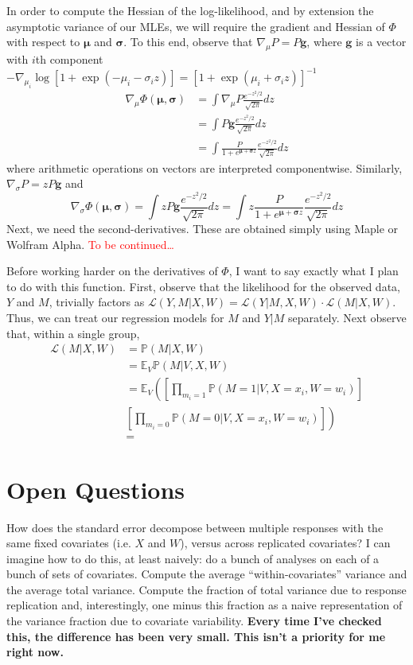 \documentclass{article}
\newcommand{\bP}{\mathbb{P}}
\newcommand{\bE}{\mathbb{E}}
\newcommand{\zdens}{\frac{e^{-z^2/2}}{\sqrt{2\pi}}}
\begin{document}
In order to compute the Hessian of the log-likelihood, and by extension the asymptotic variance of our MLEs, we will require the gradient and Hessian of $\Phi$ with respect to $\bm{\mu}$ and $\bm{\sigma}$. To this end, observe that $\nabla_\mu P = P \bm{g}$, where $\bm{g}$ is a vector with $i$th component $- \nabla_{\mu_i} \log[1 + \exp(-\mu_i - \sigma_i z)] = [1 + \exp(\mu_i + \sigma_i z)]^{-1}$
%
\begin{align}
    \nabla_{\mu} \Phi(\bm{\mu}, \bm{\sigma}) &= \int \nabla_\mu P \frac{e^{-z^2/2}}{\sqrt{2\pi}} dz\\
    &=  \int P \bm{g} \zdens dz\\
    &= \int \frac{P}{1 + e^{\bm{\mu} + \bm{\sigma}z}} \zdens dz
\end{align}
%
where arithmetic operations on vectors are interpreted componentwise.
Similarly, $\nabla_\sigma P = z P \bm{g}$ and
%
\begin{equation}
    \nabla_{\sigma} \Phi(\bm{\mu}, \bm{\sigma}) = \int z P \bm{g} \zdens dz = \int z \frac{P}{1 + e^{\bm{\mu} + \bm{\sigma}z}} \zdens dz
\end{equation}
%
Next, we need the second-derivatives. These are obtained simply using Maple or Wolfram Alpha. \textcolor{red}{To be continued\ldots}

Before working harder on the derivatives of $\Phi$, I want to say exactly what I plan to do with this function. First, observe that the likelihood for the observed data, $Y$ and $M$, trivially factors as $\mathcal{L}(Y, M | X, W) = \mathcal{L}(Y|M, X, W) \cdot \mathcal{L}(M| X, W)$. Thus, we can treat our regression models for $M$ and $Y|M$ separately. Next observe that, within a single group,
%
\begin{align}
    \mathcal{L}(M| X, W) &= \bP(M| X, W)\\
    &= \bE_V \bP(M | V, X, W)\\
    &= \bE_V \left( \left[ \prod_{m_i = 1} \bP(M=1 |V, X=x_i, W=w_i) \right]\right. \nonumber \\ 
    &\left.\left[ \prod_{m_i = 0} \bP(M=0 |V, X=x_i, W=w_i)\right]\right)\\
    &= 
\end{align}



\section{Open Questions}

How does the standard error decompose between multiple responses with the same fixed covariates (i.e. $X$ and $W$), versus across replicated covariates? I can imagine how to do this, at least naively: do a bunch of analyses on each of a bunch of sets of covariates. Compute the average ``within-covariates'' variance and the average total variance. Compute the fraction of total variance due to response replication and, interestingly, one minus this fraction as a naive representation of the variance fraction due to covariate variability. \textbf{Every time I've checked this, the difference has been very small. This isn't a priority for me right now.}
\end{document}

